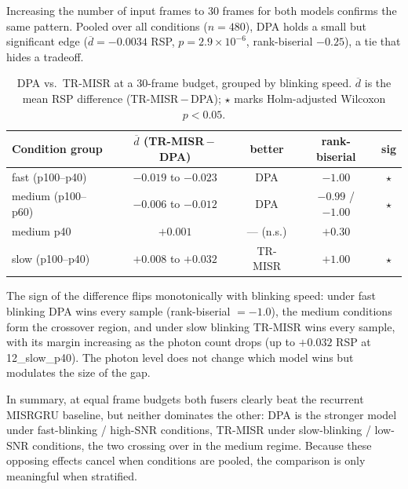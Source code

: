 Increasing the number of input frames to 30 frames for both models confirms the same
pattern. Pooled over all conditions ($n = 480$), DPA holds a small but significant
edge ($\overline{d} = -0.0034$ RSP, $p = 2.9\times10^{-6}$, rank-biserial
$-0.25$), a tie that hides a tradeoff.

\begin{table}[htbp]
  \centering
  \caption{DPA vs.\ TR-MISR at a 30-frame budget, grouped by blinking speed.
           $\overline{d}$ is the mean RSP difference (TR-MISR\,$-$\,DPA);
           $\star$ marks Holm-adjusted Wilcoxon $p < 0.05$.}
  \label{tab:sig_30f}
  \begin{tabular}{lcccc}
    \toprule
    \textbf{Condition group} & $\overline{d}$ \textbf{(TR-MISR\,$-$\,DPA)} &
    \textbf{better} & \textbf{rank-biserial} & \textbf{sig} \\
    \midrule
    fast (p100--p40)   & $-0.019$ to $-0.023$ & DPA     & $-1.00$            & $\star$ \\
    medium (p100--p60) & $-0.006$ to $-0.012$ & DPA     & $-0.99$ / $-1.00$  & $\star$ \\
    medium p40         & $+0.001$             & --- (n.s.) & $+0.30$          &         \\
    slow (p100--p40)   & $+0.008$ to $+0.032$ & TR-MISR & $+1.00$            & $\star$ \\
    \bottomrule
  \end{tabular}
\end{table}

The sign of the difference flips monotonically with blinking speed: under fast
blinking DPA wins every sample (rank-biserial $=-1.0$), the medium conditions form
the crossover region, and under slow blinking TR-MISR wins every sample, with its
margin increasing as the photon count drops (up to $+0.032$ RSP at
12\_slow\_p40). The photon level does not change which model wins but modulates the
size of the gap.

In summary, at equal frame budgets both fusers clearly beat the recurrent MISRGRU
baseline, but neither dominates the other: DPA is the stronger model under
fast-blinking / high-SNR conditions, TR-MISR under slow-blinking / low-SNR
conditions, the two crossing over in the medium regime. Because these opposing
effects cancel when conditions are pooled, the comparison is only meaningful when
stratified.
